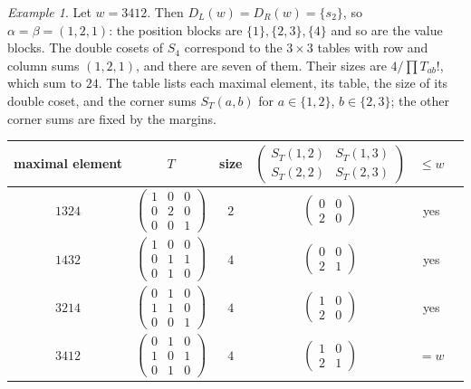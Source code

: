 \documentclass[11pt]{amsart}
\theoremstyle{definition}
\theoremstyle{remark}
\newtheorem{exa}{Example}[section]
\begin{document}
\begin{exa}\label{exa:tables}
Let $w=3412$. Then $D_L(w)=D_R(w)=\{s_2\}$, so $\alpha=\beta=(1,2,1)$: the position blocks are $\{1\},\{2,3\},\{4\}$ and so are the value blocks. The double cosets of $S_4$ correspond to the $3\times3$ tables with row and column sums $(1,2,1)$, and there are seven of them. Their sizes are $4/\prod T_{ab}!$, which sum to $24$. The table lists each maximal element, its table, the size of its double coset, and the corner sums $S_T(a,b)$ for $a\in\{1,2\}$, $b\in\{2,3\}$; the other corner sums are fixed by the margins.
\begin{center}
\small
\renewcommand{\arraystretch}{1.9}
\begin{tabular}{cccccc}
\toprule
maximal element & $T$ & size & $\begin{pmatrix}S_T(1,2)&S_T(1,3)\\S_T(2,2)&S_T(2,3)\end{pmatrix}$ & $\le w$ \\
\midrule
$1324$ & $\left(\begin{smallmatrix}1&0&0\\0&2&0\\0&0&1\end{smallmatrix}\right)$ & $2$ & $\left(\begin{smallmatrix}0&0\\2&0\end{smallmatrix}\right)$ & yes\\
$1432$ & $\left(\begin{smallmatrix}1&0&0\\0&1&1\\0&1&0\end{smallmatrix}\right)$ & $4$ & $\left(\begin{smallmatrix}0&0\\2&1\end{smallmatrix}\right)$ & yes\\
$3214$ & $\left(\begin{smallmatrix}0&1&0\\1&1&0\\0&0&1\end{smallmatrix}\right)$ & $4$ & $\left(\begin{smallmatrix}1&0\\2&0\end{smallmatrix}\right)$ & yes\\
$3412$ & $\left(\begin{smallmatrix}0&1&0\\1&0&1\\0&1&0\end{smallmatrix}\right)$ & $4$ & $\left(\begin{smallmatrix}1&0\\2&1\end{smallmatrix}\right)$ & $=w$\\

\end{tabular}
\end{center}
\end{exa}
\end{document}

